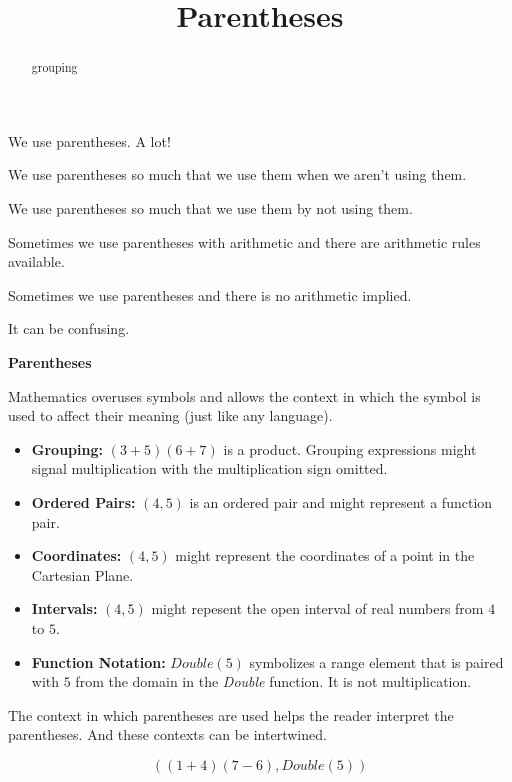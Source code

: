 \documentclass{ximera}
\title{Parentheses}
\begin{document}
\begin{abstract}
grouping
\end{abstract}
\maketitle



We use parentheses. A lot! 

We use parentheses so much that we use them when we aren't using them. 

We use parentheses so much that we use them by not using them. 

Sometimes we use parentheses with arithmetic and there are arithmetic rules available. 

Sometimes we use parentheses and there is no arithmetic implied. 


It can be confusing.  









\begin{notation}  \textbf{\textcolor{red!50!green}{Parentheses}}  

Mathematics overuses symbols and allows the context in which the symbol is used to affect their meaning (just like any language).
  \begin{itemize}
    \item \textbf{Grouping:} $(3+5)(6+7)$ is a product.  Grouping expressions might signal multiplication with the multiplication sign omitted.
    \item \textbf{Ordered Pairs:} $(4, 5)$ is an ordered pair and might represent a function pair.
    \item \textbf{Coordinates:} $(4, 5)$ might represent the coordinates of a point in the Cartesian Plane.
    \item \textbf{Intervals:} $(4, 5)$ might repesent the open interval of real numbers from $4$ to $5$.
    \item \textbf{Function Notation:} $Double(5)$ symbolizes a range element that is paired with $5$ from the domain in the \textit{Double} function. It is not multiplication.
  \end{itemize}


The context in which parentheses are used helps the reader interpret the parentheses.  And these contexts can be intertwined.

\[  ((1+4)(7-6), Double(5))    \]
\end{notation}
\end{document}
